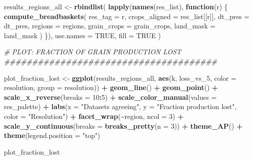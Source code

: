 \documentclass[
  11pt,
]{article}
\newenvironment{Shaded}{\begin{snugshade}}{\end{snugshade}}
\newcommand{\AttributeTok}[1]{\textcolor[rgb]{0.13,0.29,0.53}{#1}}
\newcommand{\CommentTok}[1]{\textcolor[rgb]{0.56,0.35,0.01}{\textit{#1}}}
\newcommand{\ConstantTok}[1]{\textcolor[rgb]{0.56,0.35,0.01}{#1}}
\newcommand{\ControlFlowTok}[1]{\textcolor[rgb]{0.13,0.29,0.53}{\textbf{#1}}}
\newcommand{\DecValTok}[1]{\textcolor[rgb]{0.00,0.00,0.81}{#1}}
\newcommand{\FunctionTok}[1]{\textcolor[rgb]{0.13,0.29,0.53}{\textbf{#1}}}
\newcommand{\NormalTok}[1]{#1}
\newcommand{\OtherTok}[1]{\textcolor[rgb]{0.56,0.35,0.01}{#1}}
\newcommand{\SpecialCharTok}[1]{\textcolor[rgb]{0.81,0.36,0.00}{\textbf{#1}}}
\newcommand{\StringTok}[1]{\textcolor[rgb]{0.31,0.60,0.02}{#1}}
\begin{document}
\begin{Shaded}
\begin{Highlighting}[]
\NormalTok{results\_regions\_all }\OtherTok{\textless{}{-}} \FunctionTok{rbindlist}\NormalTok{(}
  \FunctionTok{lapply}\NormalTok{(}\FunctionTok{names}\NormalTok{(res\_list), }\ControlFlowTok{function}\NormalTok{(r) \{}
    \FunctionTok{compute\_breadbaskets}\NormalTok{(}
      \AttributeTok{res\_tag =}\NormalTok{ r,}
      \AttributeTok{crops\_aligned =}\NormalTok{ res\_list[[r]],}
      \AttributeTok{dt\_pres =}\NormalTok{ dt\_pres,}
      \AttributeTok{regions =}\NormalTok{ regions,}
      \AttributeTok{grain\_crops =}\NormalTok{ grain\_crops,}
      \AttributeTok{land\_mask =}\NormalTok{ land\_mask}
\NormalTok{    )}
\NormalTok{  \}),}
  \AttributeTok{use.names =} \ConstantTok{TRUE}\NormalTok{,}
  \AttributeTok{fill =} \ConstantTok{TRUE}
\NormalTok{)}

\CommentTok{\# PLOT: FRACTION OF GRAIN PRODUCTION LOST \#\#\#\#\#\#\#\#\#\#\#\#\#\#\#\#\#\#\#\#\#\#\#\#\#\#\#\#\#\#\#\#\#\#\#\#\#\#}

\NormalTok{plot\_fraction\_lost }\OtherTok{\textless{}{-}} \FunctionTok{ggplot}\NormalTok{(results\_regions\_all, }\FunctionTok{aes}\NormalTok{(k, loss\_vs\_5,}
                                                      \AttributeTok{color =}\NormalTok{ resolution,}
                                                      \AttributeTok{group =}\NormalTok{ resolution)) }\SpecialCharTok{+}
  \FunctionTok{geom\_line}\NormalTok{() }\SpecialCharTok{+}
  \FunctionTok{geom\_point}\NormalTok{() }\SpecialCharTok{+}
  \FunctionTok{scale\_x\_reverse}\NormalTok{(}\AttributeTok{breaks =} \DecValTok{10}\SpecialCharTok{:}\DecValTok{5}\NormalTok{) }\SpecialCharTok{+}
  \FunctionTok{scale\_color\_manual}\NormalTok{(}\AttributeTok{values =}\NormalTok{ res\_palette) }\SpecialCharTok{+}
  \FunctionTok{labs}\NormalTok{(}\AttributeTok{x =} \StringTok{"Datasets agreeing"}\NormalTok{,}
       \AttributeTok{y =} \StringTok{"Fraction production lost"}\NormalTok{,}
       \AttributeTok{color =} \StringTok{"Resolution"}\NormalTok{) }\SpecialCharTok{+}
  \FunctionTok{facet\_wrap}\NormalTok{(}\SpecialCharTok{\textasciitilde{}}\NormalTok{region, }\AttributeTok{ncol =} \DecValTok{3}\NormalTok{) }\SpecialCharTok{+}
  \FunctionTok{scale\_y\_continuous}\NormalTok{(}\AttributeTok{breaks =} \FunctionTok{breaks\_pretty}\NormalTok{(}\AttributeTok{n =} \DecValTok{3}\NormalTok{)) }\SpecialCharTok{+}
  \FunctionTok{theme\_AP}\NormalTok{() }\SpecialCharTok{+}
  \FunctionTok{theme}\NormalTok{(}\AttributeTok{legend.position =} \StringTok{"top"}\NormalTok{)}

\NormalTok{plot\_fraction\_lost}
\end{Highlighting}
\end{Shaded}
\end{document}
